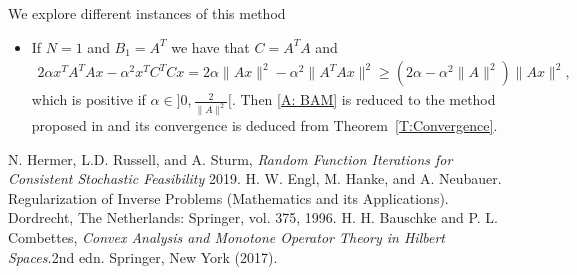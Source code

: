 \documentclass[11pt]{report}
\theoremstyle{plain}{\theorembodyfont{\rmfamily}%
\newtheorem{assumption}[theorem]{Assumption}}
\theoremstyle{plain}{\theorembodyfont{\rmfamily}%
\newtheorem{algorithm}[theorem]{Algorithm}}
\theoremstyle{plain}{\theorembodyfont{\rmfamily}%
\newtheorem{example}[theorem]{Example}}
\theoremstyle{plain}{\theorembodyfont{\rmfamily}%
\newtheorem{remark}[theorem]{Remark}}
\theoremstyle{plain}{\theorembodyfont{\rmfamily}%
\newtheorem{definition}[theorem]{Definition}}
\theoremstyle{plain}{\theorembodyfont{\rmfamily}%
\newtheorem{problem}[theorem]{Problem}}
\numberwithin{equation}{chapter}
\begin{document}
\begin{remark}We explore different instances of this method\\
    \begin{itemize}
    \item  If $N=1$ and $B_1=A^{T}$ we have that $C=A^{T}A$ and
    \begin{align}
        2\alpha x^{T}A^{T}Ax-\alpha^{2}x^{T}C^{T}Cx=2\alpha \|Ax\|^{2}-\alpha^{2}\|A^{T}Ax\|^{2}\geq (2\alpha -\alpha^{2}\|A\|^2)\|Ax\|^{2},
    \end{align}
 which is positive if $\alpha\in]0,\frac{2}{\|A\|^2}[$.
 Then \eqref{A: BAM}  is reduced to the method proposed in  \cite{Landweber} and
 its convergence is deduced from Theorem~\ref{T:Convergence}. 
\end{itemize}
\end{remark}
\begin{thebibliography}{99}
    \setlength{\itemsep}{1pt}
    {\sc N. Hermer, L.D. Russell, and A. Sturm}, {\it Random Function Iterations for Consistent
    Stochastic Feasibility} 2019.
 H. W. Engl, M. Hanke, and A. Neubauer. Regularization of Inverse Problems (Mathematics and its Applications).  Dordrecht, The Netherlands: Springer, vol. 375, 1996.
    {\sc H. H. Bauschke and P. L. Combettes,}
    {\em Convex Analysis and Monotone Operator Theory in Hilbert Spaces.}2nd edn. Springer, New York (2017).
    \end{thebibliography}
\end{document}
